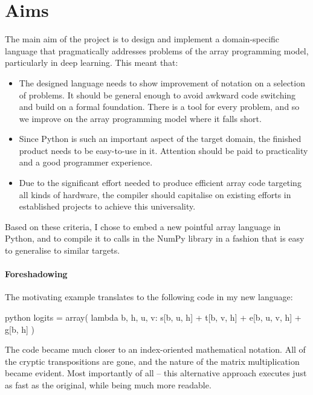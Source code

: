 \section{Aims}

The main aim of the project is to design and implement a domain-specific language that pragmatically addresses problems of the array programming model, particularly in deep learning. This meant that:
\begin{itemize}
    \item The designed language needs to show improvement of notation on a selection of problems. It should be general enough to avoid awkward code switching and build on a formal foundation. There is a tool for every problem, and so we improve on the array programming model where it falls short. 
    \item Since Python is such an important aspect of the target domain, the finished product needs to be easy-to-use in it. Attention should be paid to practicality and a good programmer experience.
    \item Due to the significant effort needed to produce efficient array code targeting all kinds of hardware, the compiler should capitalise on existing efforts in established projects to achieve this universality.
\end{itemize}
Based on these criteria, I chose to embed a new pointful array language in Python, and to compile it to calls in the NumPy library in a fashion that is easy to generalise to similar targets. 

\paragraph{Foreshadowing} The motivating example translates to the following code in my new language:
\begin{center}
\begin{cminted}{python}
logits = array(
    lambda b, h, u, v: s[b, u, h] + t[b, v, h] + e[b, u, v, h] + g[b, h]
)
\end{cminted}
\end{center}
The code became much closer to an index-oriented mathematical notation. All of the cryptic transpositions are gone, and the nature of the matrix multiplication became evident. Most importantly of all -- this alternative approach executes just as fast as the original, while being much more readable.
